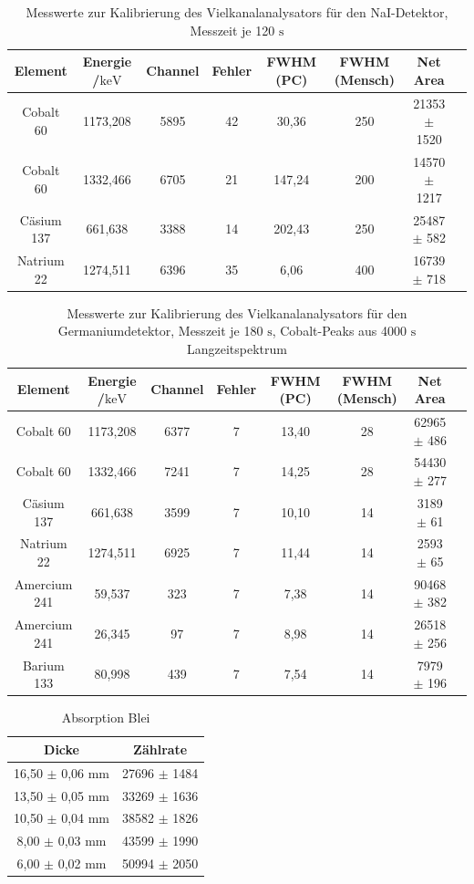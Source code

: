 \documentclass[
	parskip=half,10pt,
	numbers= noenddot, %
	toc=flat, %
	oneside,
	twocolumn,
	]{scrartcl}
\begin{document}
\FloatBarrier
\begin{appendix}

\begin{table}[h]
 \begin{tabular}{cccccccc}
Element & Energie /$\si{\kilo \electronvolt}$& Channel & Fehler & FWHM (PC) & FWHM (Mensch) & Net Area \\
\hline
Cobalt 60  & 1173,208 & 5895 & 42 & 30,36 & 250 & 21353 $\pm$ 1520 \\
Cobalt 60  & 1332,466 & 6705 & 21 & 147,24 & 200 & 14570 $\pm$ 1217 \\
Cäsium 137 &  661,638 & 3388 & 14 & 202,43 & 250 & 25487 $\pm$ 582 \\
Natrium 22 & 1274,511 & 6396 & 35 & 6,06 & 400 & 16739 $\pm$ 718 \\
 \end{tabular}
\caption{Messwerte zur Kalibrierung des Vielkanalanalysators für den NaI-Detektor, Messzeit je 120 $\si{\second}$}
\label{tab:kalib_NaI}
\end{table}

\begin{table}[h]
 \begin{tabular}{cccccccc}
Element & Energie /$\si{\kilo \electronvolt}$& Channel & Fehler & FWHM (PC) & FWHM (Mensch) & Net Area \\
\hline
Cobalt 60    & 1173,208 & 6377 & 7 & 13,40 & 28 & 62965 $\pm$ 486 \\
Cobalt 60    & 1332,466 & 7241 & 7 & 14,25 & 28 & 54430 $\pm$ 277 \\
Cäsium 137   &  661,638 & 3599 & 7 & 10,10 & 14 &  3189 $\pm$  61 \\
Natrium 22   & 1274,511 & 6925 & 7 & 11,44 & 14 &  2593 $\pm$  65 \\
Amercium 241 &   59,537 &  323 & 7 &  7,38 & 14 & 90468 $\pm$ 382 \\
Amercium 241 &   26,345 &   97 & 7 &  8,98 & 14 & 26518 $\pm$ 256 \\
Barium 133   &   80,998 &  439 & 7 &  7,54 & 14 &  7979 $\pm$ 196
\end{tabular}
\caption{Messwerte zur Kalibrierung des Vielkanalanalysators für den Germaniumdetektor, Messzeit je 180 $\si{\second}$, Cobalt-Peaks aus 4000 $\si{\second}$ 
Langzeitspektrum}
\label{tab:Kalib_Ge}
\end{table}


\begin{table}[h]
\centering
\begin{tabular}{cc}
 Dicke & Zählrate  \\
 \hline 
 16,50 $\pm$ 0,06 mm & 27696 $\pm$ 1484  \\
 13,50 $\pm$ 0,05 mm & 33269 $\pm$ 1636  \\
 10,50 $\pm$ 0,04 mm & 38582 $\pm$ 1826  \\
  8,00 $\pm$ 0,03 mm & 43599 $\pm$ 1990  \\
  6,00 $\pm$ 0,02 mm & 50994 $\pm$ 2050  \\
\end{tabular}
\caption{Absorption Blei}
\label{tab:abs_blei}
\end{table}


\end{appendix}
\end{document}
